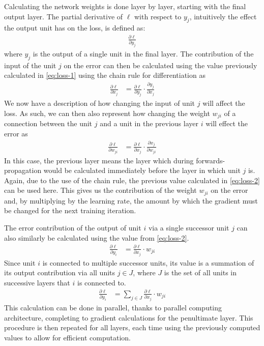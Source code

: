 Calculating the network weights is done layer by layer, starting with the final output layer.
The partial derivative of $\ell$ with respect to $y_j$, intuitively the effect the output unit has on the loss, is defined as:
\begin{align}\label{eq:loss-1}
	\frac{\partial \ell}{\partial y_j}
\end{align}
where $y_j$ is the output of a single unit in the final layer.
The contribution of the input of the unit $j$ on the error can then be calculated using the value previously calculated in \eqref{eq:loss-1} using the chain rule for differentiation as
\begin{align}\label{eq:loss-2}
	\frac{\partial\ell}{\partial x_j} &= \frac{\partial \ell}{\partial y_j} \cdot \frac{\partial y_j}{\partial x_j}
\end{align}
We now have a description of how changing the input of unit $j$ will affect the loss.
As such, we can then also represent how changing the weight $w_{ji}$ of a connection between the unit $j$ and a unit in the previous layer $i$ will effect the error as
\begin{align}\label{eq:loss-3}
	\frac{\partial \ell}{\partial w_{ji}} &= \frac{\partial \ell}{\partial x_j} \cdot \frac{\partial x_j}{\partial w_{ji}}
\end{align}
In this case, the previous layer means the layer which during forwards-propagation would be calculated immediately before the layer in which unit $j$ is.
Again, due to the use of the chain rule, the previous value calculated in \eqref{eq:loss-2} can be used here.
This gives us the contribution of the weight $w_{ji}$ on the error and, by multiplying by the learning rate, the amount by which the gradient must be changed for the next training iteration.

The error contribution of the output of unit $i$ via a single successor unit $j$ can also similarly be calculated using the value from \eqref{eq:loss-2}.
\begin{align}\label{eq:loss-4}
	\frac{\partial \ell}{\partial y_i} &= \frac{\partial \ell}{\partial x_j} \cdot w_{ji}
\end{align}
Since unit $i$ is connected to multiple successor units, its value is a summation of its output contribution via all units $j \in J$, where $J$ is the set of all units in successive layers that $i$ is connected to.
\begin{align}
	\frac{\partial \ell}{\partial y_i} &= \sum_{j \in J} \frac{\partial \ell}{\partial x_j} \cdot w_{ji}
\end{align}
This calculation can be done in parallel, thanks to parallel computing architecture, completing to gradient calculations for the penultimate layer.
This procedure is then repeated for all layers, each time using the previously computed values to allow for efficient computation.


